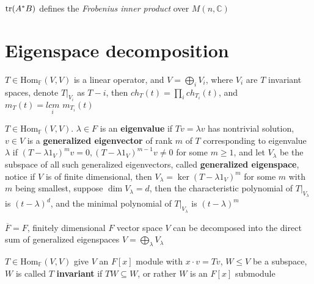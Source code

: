 \documentclass[main]{subfiles}
\begin{document}
\begin{definition}
$\operatorname{tr}(A^*B)$ defines the \textit{Frobenius inner product} over $M(n,\mathbb C)$
\end{definition}



\section{Eigenspace decomposition}

\begin{proposition}
$T\in\mathrm{Hom}_{\mathbb F}(V,V)$ is a linear operator, and $V=\displaystyle\bigoplus_{i}V_i$, where $V_i$ are $T$ invariant spaces, denote $T|_{V_i}$ as $T-i$, then $ch_T(t)=\displaystyle\prod_{i}ch_{T_i}(t)$, and $m_T(t)=\underset{i}{lcm}\,\, m_{T_i}(t)$
\end{proposition}

\begin{definition}
$T\in\mathrm{Hom}_{\mathbb F}(V,V)$. $\lambda\in F$ is an \textbf{eigenvalue} if $Tv=\lambda v$ has nontrivial solution, $v\in V$ is a \textbf{generalized eigenvector} of rank $m$ of $T$ corresponding to eigenvalue $\lambda$ if $(T-\lambda1_V)^mv=0,(T-\lambda1_V)^{m-1}v\neq0$ for some $m\geq1$, and let $V_\lambda$ be the subspace of all such generalized eigenvectors, called \textbf{generalized eigenspace}, notice if $V$ is of finite dimensional, then $V_\lambda=\ker(T-\lambda1_V)^m$ for some $m$ with $m$ being smallest, suppose $\dim V_\lambda=d$, then the characteristic polynomial of $T|_{V_\lambda}$ is $(t-\lambda)^d$, and the minimal polynomial of $T|_{V_\lambda}$ is $(t-\lambda)^m$
\end{definition}

\begin{proposition}\label{Generalized eigenspace decomposition}
$\overline F=F$, finitely dimensional $F$ vector space $V$ can be decomposed into the direct sum of generalized eigenspaces $V=\displaystyle\bigoplus_{\lambda}V_\lambda$
\end{proposition}

\begin{definition}
$T\in\mathrm{Hom}_{\mathbb F}(V,V)$ give $V$ an $F[x]$ module with $x\cdot v=Tv$, $W\leq V$ be a subspace, $W$ is called $T$ \textbf{invariant} if $TW\subseteq W$, or rather $W$ is an $F[x]$ submodule
\end{definition}
\end{document}
